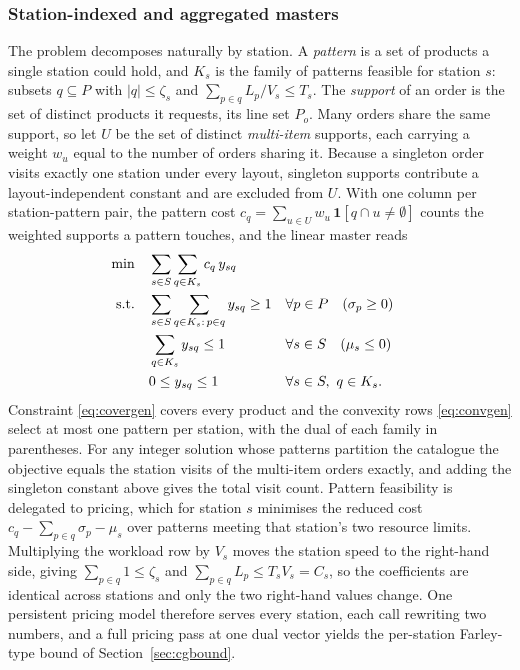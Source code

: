 \documentclass[]{interact}
\begin{document}
\subsubsection{Station-indexed and aggregated masters}\label{sec:cgmaster}
The problem decomposes naturally by station. A \emph{pattern} is a set of products a single station could hold, and $K_s$ is the family of patterns feasible for station $s$: subsets $q \subseteq P$ with $|q| \le \zeta_s$ and $\sum_{p \in q} L_p / V_s \le T_s$. The \emph{support} of an order is the set of distinct products it requests, its line set $P_o$. Many orders share the same support, so let $U$ be the set of distinct \emph{multi-item} supports, each carrying a weight $w_u$ equal to the number of orders sharing it. Because a singleton order visits exactly one station under every layout, singleton supports contribute a layout-independent constant and are excluded from $U$. With one column per station-pattern pair, the pattern cost $c_q = \sum_{u \in U} w_u\,\mathbf{1}[q \cap u \neq \emptyset]$ counts the weighted supports a pattern touches, and the linear master reads
\begin{align}
\min \quad & \sum_{s \in S} \sum_{q \in K_s} c_q\, y_{sq} \notag\\
\text{s.t.} \quad
& \sum_{s \in S} \sum_{q \in K_s:\, p \in q} y_{sq} \ge 1 && \forall p \in P \quad (\sigma_p \ge 0) \label{eq:covergen}\\
& \sum_{q \in K_s} y_{sq} \le 1 && \forall s \in S \quad (\mu_s \le 0) \label{eq:convgen}\\
& 0 \le y_{sq} \le 1 && \forall s \in S,\ q \in K_s. \notag
\end{align}
Constraint \eqref{eq:covergen} covers every product and the convexity rows \eqref{eq:convgen} select at most one pattern per station, with the dual of each family in parentheses. For any integer solution whose patterns partition the catalogue the objective equals the station visits of the multi-item orders exactly, and adding the singleton constant above gives the total visit count. Pattern feasibility is delegated to pricing, which for station $s$ minimises the reduced cost $c_q - \sum_{p \in q} \sigma_p - \mu_s$ over patterns meeting that station's two resource limits. Multiplying the workload row by $V_s$ moves the station speed to the right-hand side, giving $\sum_{p \in q} 1 \le \zeta_s$ and $\sum_{p \in q} L_p \le T_s V_s = C_s$, so the coefficients are identical across stations and only the two right-hand values change. One persistent pricing model therefore serves every station, each call rewriting two numbers, and a full pricing pass at one dual vector yields the per-station Farley-type bound of Section~\ref{sec:cgbound}.
\end{document}
